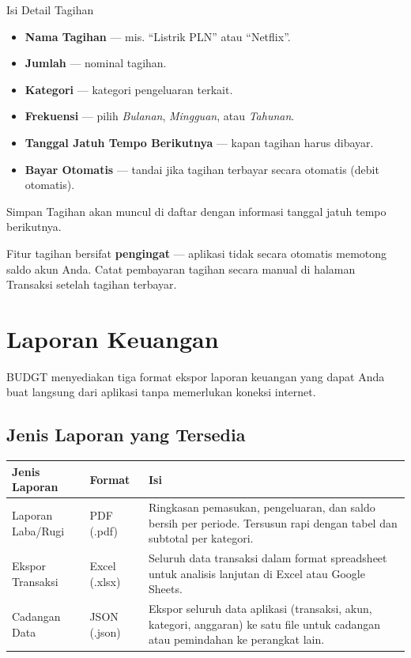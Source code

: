 \documentclass[12pt, a4paper]{article}
\begin{document}
\begin{stepbox}{Isi Detail Tagihan}
  \begin{itemize}[leftmargin=1em, itemsep=2pt]
    \item \textbf{Nama Tagihan} --- mis. ``Listrik PLN'' atau ``Netflix''.
    \item \textbf{Jumlah} --- nominal tagihan.
    \item \textbf{Kategori} --- kategori pengeluaran terkait.
    \item \textbf{Frekuensi} --- pilih \textit{Bulanan}, \textit{Mingguan}, atau \textit{Tahunan}.
    \item \textbf{Tanggal Jatuh Tempo Berikutnya} --- kapan tagihan harus dibayar.
    \item \textbf{Bayar Otomatis} --- tandai jika tagihan terbayar secara otomatis (debit otomatis).
  \end{itemize}
\end{stepbox}

\begin{stepbox}{Simpan}
  Tagihan akan muncul di daftar dengan informasi tanggal jatuh tempo berikutnya.
\end{stepbox}

\begin{notebox}
Fitur tagihan bersifat \textbf{pengingat} --- aplikasi tidak secara otomatis memotong saldo akun Anda. Catat pembayaran tagihan secara manual di halaman Transaksi setelah tagihan terbayar.
\end{notebox}

\section{Laporan Keuangan}

BUDGT menyediakan tiga format ekspor laporan keuangan yang dapat Anda buat langsung dari aplikasi tanpa memerlukan koneksi internet.

\subsection{Jenis Laporan yang Tersedia}

\begin{longtable}{L{3.5cm} L{3cm} L{7.5cm}}
  \toprule
  \textbf{Jenis Laporan} & \textbf{Format} & \textbf{Isi} \\
  \midrule
  \endhead
  Laporan Laba/Rugi & PDF (.pdf) & Ringkasan pemasukan, pengeluaran, dan saldo bersih per periode. Tersusun rapi dengan tabel dan subtotal per kategori. \\[4pt]
  Ekspor Transaksi & Excel (.xlsx) & Seluruh data transaksi dalam format spreadsheet untuk analisis lanjutan di Excel atau Google Sheets. \\[4pt]
  Cadangan Data & JSON (.json) & Ekspor seluruh data aplikasi (transaksi, akun, kategori, anggaran) ke satu file untuk cadangan atau pemindahan ke perangkat lain. \\
  \bottomrule
\end{longtable}
\end{document}
